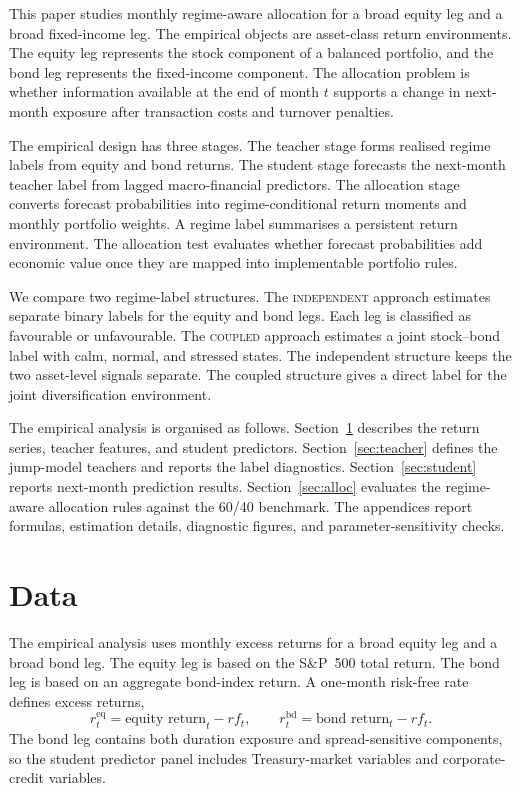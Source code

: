 \documentclass[10pt]{article}
\newcommand{\Acoup}{\textsc{coupled}}
\newcommand{\Bindep}{\textsc{independent}}
\begin{document}
This paper studies monthly regime-aware allocation for a broad equity leg and a broad fixed-income leg. The empirical objects are asset-class return environments. The equity leg represents the stock component of a balanced portfolio, and the bond leg represents the fixed-income component. The allocation problem is whether information available at the end of month \(t\) supports a change in next-month exposure after transaction costs and turnover penalties.

The empirical design has three stages. The teacher stage forms realised regime labels from equity and bond returns. The student stage forecasts the next-month teacher label from lagged macro-financial predictors. The allocation stage converts forecast probabilities into regime-conditional return moments and monthly portfolio weights. A regime label summarises a persistent return environment. The allocation test evaluates whether forecast probabilities add economic value once they are mapped into implementable portfolio rules.

We compare two regime-label structures. The \Bindep{} approach estimates separate binary labels for the equity and bond legs. Each leg is classified as favourable or unfavourable. The \Acoup{} approach estimates a joint stock--bond label with calm, normal, and stressed states. The independent structure keeps the two asset-level signals separate. The coupled structure gives a direct label for the joint diversification environment.

The empirical analysis is organised as follows. Section~\ref{sec:data} describes the return series, teacher features, and student predictors. Section~\ref{sec:teacher} defines the jump-model teachers and reports the label diagnostics. Section~\ref{sec:student} reports next-month prediction results. Section~\ref{sec:alloc} evaluates the regime-aware allocation rules against the 60/40 benchmark. The appendices report formulas, estimation details, diagnostic figures, and parameter-sensitivity checks.

\section{Data}
\label{sec:data}
The empirical analysis uses monthly excess returns for a broad equity leg and a broad bond leg. The equity leg is based on the S\&P~500 total return. The bond leg is based on an aggregate bond-index return. A one-month risk-free rate defines excess returns,
\[
    r^{\mathrm{eq}}_t=\text{equity return}_t-rf_t,\qquad
    r^{\mathrm{bd}}_t=\text{bond return}_t-rf_t .
\]
The bond leg contains both duration exposure and spread-sensitive components, so the student predictor panel includes Treasury-market variables and corporate-credit variables.
\end{document}
